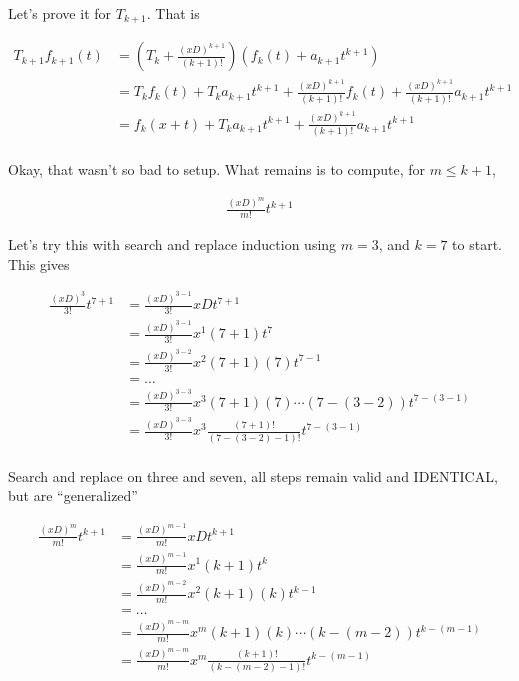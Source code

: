 Let's prove it for $T_{k+1}$.  That is

\begin{align*}
T_{k+1} f_{k+1}(t) 
&= 
\left( T_{k} + \frac{(xD)^{k+1}}{(k+1)!} \right) \left( f_{k}(t) + a_{k+1}t^{k+1} \right) \\
&=
T_{k} f_{k}(t) 
+T_{k} a_{k+1}t^{k+1}
+\frac{(xD)^{k+1}}{(k+1)!} f_{k}(t) 
+\frac{(xD)^{k+1}}{(k+1)!} a_{k+1}t^{k+1}
\\
&=
f_{k}(x + t) 
+T_{k} a_{k+1}t^{k+1}
+\frac{(xD)^{k+1}}{(k+1)!} a_{k+1}t^{k+1}
\\
\end{align*}

Okay, that wasn't so bad to setup.  What remains is to compute, for $m \le k+1$,

\begin{align*}
\frac{(xD)^{m}}{m!} t^{k+1}
\end{align*}

Let's try this with search and replace induction using $m=3$, and $k=7$ to start.  This gives

\begin{align*}
\frac{(xD)^{3}}{3!} t^{7+1}
&=
\frac{(xD)^{3-1}}{3!} xD t^{7+1} \\
&=
\frac{(xD)^{3-1}}{3!} x^1 (7+1) t^{7} \\
&=
\frac{(xD)^{3-2}}{3!} x^2 (7+1)(7) t^{7-1} \\
&=
\hdots \\
&=
\frac{(xD)^{3-3}}{3!} x^3 (7+1)(7) \cdots (7-(3-2)) t^{7-(3-1)} \\
&=
\frac{(xD)^{3-3}}{3!} x^3 \frac{(7+1)!}{(7-(3-2)-1)!} t^{7-(3-1)} \\
\end{align*}

Search and replace on three and seven, all steps remain valid and IDENTICAL, but are ``generalized''

\begin{align*}
\frac{(xD)^{m}}{m!} t^{k+1}
&=
\frac{(xD)^{m-1}}{m!} xD t^{k+1} \\
&=
\frac{(xD)^{m-1}}{m!} x^1 (k+1) t^{k} \\
&=
\frac{(xD)^{m-2}}{m!} x^2 (k+1)(k) t^{k-1} \\
&=
\hdots \\
&=
\frac{(xD)^{m-m}}{m!} x^m (k+1)(k) \cdots (k-(m-2)) t^{k-(m-1)} \\
&=
\frac{(xD)^{m-m}}{m!} x^m \frac{(k+1)!}{(k-(m-2)-1)!} t^{k-(m-1)} \\
\end{align*}


